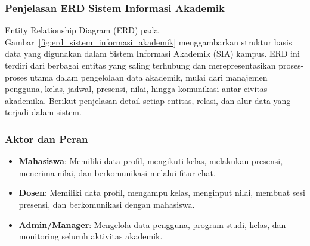 \documentclass[a4paper,oneside,11pt]{book}
\begin{document}
\subsubsection{Penjelasan ERD Sistem Informasi Akademik}

Entity Relationship Diagram (ERD) pada Gambar~\ref{fig:erd_sistem_informasi_akademik} menggambarkan struktur basis data yang digunakan dalam Sistem Informasi Akademik (SIA) kampus. ERD ini terdiri dari berbagai entitas yang saling terhubung dan merepresentasikan proses-proses utama dalam pengelolaan data akademik, mulai dari manajemen pengguna, kelas, jadwal, presensi, nilai, hingga komunikasi antar civitas akademika. Berikut penjelasan detail setiap entitas, relasi, dan alur data yang terjadi dalam sistem.

\subsubsection{Aktor dan Peran}
\begin{itemize}
  \item \textbf{Mahasiswa}: Memiliki data profil, mengikuti kelas, melakukan presensi, menerima nilai, dan berkomunikasi melalui fitur chat.
  \item \textbf{Dosen}: Memiliki data profil, mengampu kelas, menginput nilai, membuat sesi presensi, dan berkomunikasi dengan mahasiswa.
  \item \textbf{Admin/Manager}: Mengelola data pengguna, program studi, kelas, dan monitoring seluruh aktivitas akademik.
\end{itemize}
\end{document}
